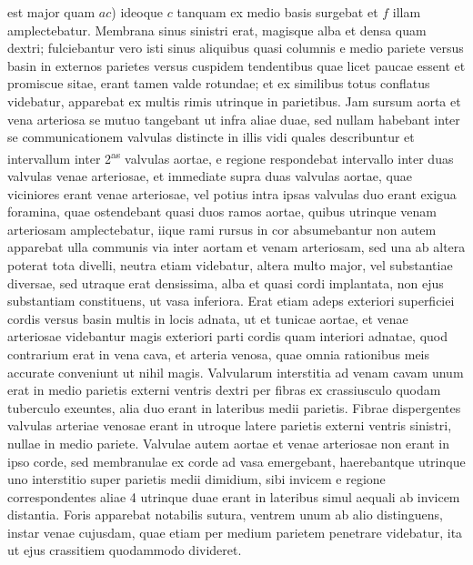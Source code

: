 est major quam $ac$) ideoque $c$ tanquam ex medio basis surgebat et $f$ illam amplectebatur. Membrana sinus sinistri erat, magisque alba et densa quam dextri; fulciebantur vero isti sinus aliquibus quasi columnis e medio pariete versus basin in externos parietes versus cuspidem tendentibus quae licet paucae essent et promiscue sitae, erant tamen valde rotundae; et ex similibus totus  conflatus videbatur,  apparebat ex multis rimis utrinque in parietibus. 
\pend 
\count{}
\count{}
\count{}
\pstart  Jam sursum aorta et vena arteriosa se mutuo tangebant ut infra aliae duae, sed nullam habebant inter se communicationem valvulas distincte in illis vidi quales describuntur et intervallum inter 2\textsuperscript{as} valvulas aortae, e regione respondebat intervallo inter duas valvulas venae arteriosae, et immediate supra duas valvulas aortae, quae viciniores erant venae arteriosae, vel potius intra ipsas valvulas duo erant exigua foramina, quae ostendebant quasi duos ramos aortae, quibus utrinque venam arteriosam amplectebatur, iique rami rursus in cor absumebantur non autem apparebat ulla communis via inter aortam et venam arteriosam, sed una ab altera poterat tota divelli, neutra etiam videbatur, altera multo major, vel substantiae diversae, sed utraque erat densissima, alba  et quasi cordi implantata, non ejus substantiam constituens, ut vasa inferiora. \pend 
\pstart  Erat etiam adeps exteriori superficiei cordis versus basin multis in locis adnata, ut et tunicae aortae, et venae arteriosae videbantur magis exteriori parti cordis quam interiori adnatae, quod contrarium erat in vena cava, et arteria venosa, quae omnia rationibus meis  accurate conveniunt ut nihil magis.
\pend 
\pstart  Valvularum interstitia ad venam cavam unum erat in medio parietis externi ventris dextri per fibras ex crassiusculo quodam tuberculo exeuntes, alia duo erant in lateribus medii parietis. Fibrae dispergentes valvulas arteriae venosae erant in utroque latere parietis externi ventris sinistri, nullae in medio pariete. 
\pend 
\pstart  Valvulae autem aortae et venae arteriosae non erant in ipso corde, sed membranulae ex corde ad vasa emergebant, haerebantque utrinque uno interstitio super parietis medii dimidium, sibi invicem e regione correspondentes aliae 4 utrinque duae erant in lateribus simul aequali ab invicem distantia. Foris apparebat notabilis sutura, ventrem unum ab alio distinguens, instar venae cujus\-dam, quae etiam per medium parietem penetrare videbatur, ita ut ejus crassitiem quodammodo divideret. 
